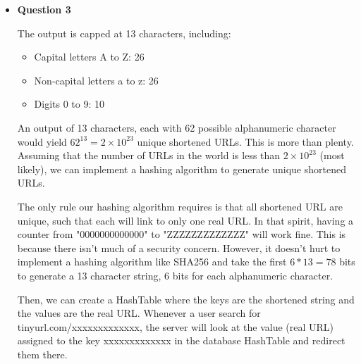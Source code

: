 \documentclass{article}
\begin{document}
\begin{itemize}
    \item\textbf{ Question 3}

    The output is capped at 13 characters, including:

    \begin{itemize}
        \item Capital letters A to Z: 26
        \item Non-capital letters a to z: 26
        \item Digits 0 to 9: 10
    \end{itemize}

    An output of 13 characters, each with 62 possible alphanumeric character would yield $62^{13} = 2 \times 10^{23}$ unique shortened URLs. This is more than plenty. Assuming that the number of URLs in the world is less than $2 \times 10^{23}$ (most likely), we can implement a hashing algorithm to generate unique shortened URLs.

    The only rule our hashing algorithm requires is that all shortened URL are unique, such that each will link to only one real URL. In that spirit, having a counter from "0000000000000" to "ZZZZZZZZZZZZZ" will work fine. This is because there isn't much of a security concern. However, it doesn't hurt to implement a hashing algorithm like SHA256 and take the first $6 * 13 = 78$ bits to generate a 13 character string, 6 bits for each alphanumeric character.
    
    Then, we can create a HashTable where the keys are the shortened string and the values are the real URL. Whenever a user search for tinyurl.com/xxxxxxxxxxxxx, the server will look at the value (real URL) assigned to the key xxxxxxxxxxxxx in the database HashTable and redirect them there.



\end{itemize}
\end{document}
